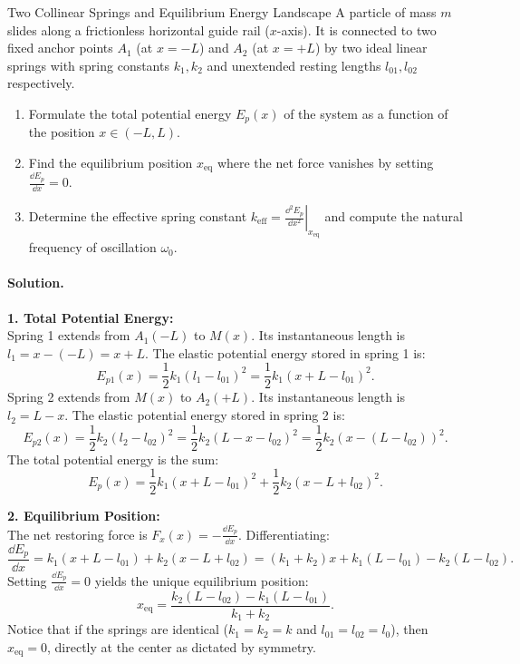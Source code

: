 \begin{workedexample}{Two Collinear Springs and Equilibrium Energy Landscape}
A particle of mass $m$ slides along a frictionless horizontal guide rail ($x$-axis). It is connected to two fixed anchor points $A_1$ (at $x = -L$) and $A_2$ (at $x = +L$) by two ideal linear springs with spring constants $k_1, k_2$ and unextended resting lengths $l_{01}, l_{02}$ respectively.
\begin{enumerate}[leftmargin=1.4em,itemsep=3pt]
  \item Formulate the total potential energy $E_p(x)$ of the system as a function of the position $x \in (-L, L)$.
  \item Find the equilibrium position $x_{\text{eq}}$ where the net force vanishes by setting $\frac{\dd E_p}{\dd x} = 0$.
  \item Determine the effective spring constant $k_{\text{eff}} = \left.\frac{\dd^2 E_p}{\dd x^2}\right|_{x_{\text{eq}}}$ and compute the natural frequency of oscillation $\omega_0$.
\end{enumerate}

\paragraph{Solution.}
\textbf{1. Total Potential Energy:}\\
Spring 1 extends from $A_1(-L)$ to $M(x)$. Its instantaneous length is $l_1 = x - (-L) = x + L$.
The elastic potential energy stored in spring 1 is:
\[
E_{p1}(x) = \frac{1}{2} k_1 (l_1 - l_{01})^2 = \frac{1}{2} k_1 (x + L - l_{01})^2.
\]
Spring 2 extends from $M(x)$ to $A_2(+L)$. Its instantaneous length is $l_2 = L - x$.
The elastic potential energy stored in spring 2 is:
\[
E_{p2}(x) = \frac{1}{2} k_2 (l_2 - l_{02})^2 = \frac{1}{2} k_2 (L - x - l_{02})^2 = \frac{1}{2} k_2 (x - (L - l_{02}))^2.
\]
The total potential energy is the sum:
\[
E_p(x) = \frac{1}{2} k_1 (x + L - l_{01})^2 + \frac{1}{2} k_2 (x - L + l_{02})^2.
\]

\textbf{2. Equilibrium Position:}\\
The net restoring force is $F_x(x) = -\frac{\dd E_p}{\dd x}$. Differentiating:
\[
\frac{\dd E_p}{\dd x} = k_1(x + L - l_{01}) + k_2(x - L + l_{02}) = (k_1 + k_2) x + k_1(L - l_{01}) - k_2(L - l_{02}).
\]
Setting $\frac{\dd E_p}{\dd x} = 0$ yields the unique equilibrium position:
\[
x_{\text{eq}} = \frac{k_2(L - l_{02}) - k_1(L - l_{01})}{k_1 + k_2}.
\]
Notice that if the springs are identical ($k_1 = k_2 = k$ and $l_{01} = l_{02} = l_0$), then $x_{\text{eq}} = 0$, directly at the center as dictated by symmetry.


\end{workedexample}
